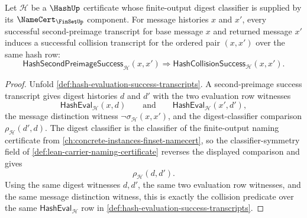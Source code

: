 \begin{theorem}
\label{thm:hash-second-preimage-success-induces-collision}
Let $\mathcal H$ be a $\HashUp$ certificate whose finite-output digest classifier is supplied by its $\NameCert_{\FinSetUp}$ component. For message histories $x$ and $x'$, every successful second-preimage transcript for base message $x$ and returned message $x'$ induces a successful collision transcript for the ordered pair $(x,x')$ over the same hash row:
$$
\mathsf{HashSecondPreimageSuccess}_{\mathcal H}(x,x')
\Longrightarrow
\mathsf{HashCollisionSuccess}_{\mathcal H}(x,x').
$$
\end{theorem}
\begin{proof}
Unfold \autoref{def:hash-evaluation-success-transcripts}. A second-preimage success transcript gives digest histories $d$ and $d'$ with the two evaluation row witnesses
$$
\mathsf{HashEval}_{\mathcal H}(x,d)
\qquad\text{and}\qquad
\mathsf{HashEval}_{\mathcal H}(x',d'),
$$
the message distinction witness $\neg\sigma_{\mathcal H}(x,x')$, and the digest-classifier comparison $\rho_{\mathcal H}(d',d)$. The digest classifier is the classifier of the finite-output naming certificate from \autoref{ch:concrete-instances-finset-namecert}, so the classifier-symmetry field of \autoref{def:lean-carrier-naming-certificate} reverses the displayed comparison and gives
$$
\rho_{\mathcal H}(d,d').
$$
Using the same digest witnesses $d,d'$, the same two evaluation row witnesses, and the same message distinction witness, this is exactly the collision predicate over the same $\mathsf{HashEval}_{\mathcal H}$ row in \autoref{def:hash-evaluation-success-transcripts}.
\end{proof}

